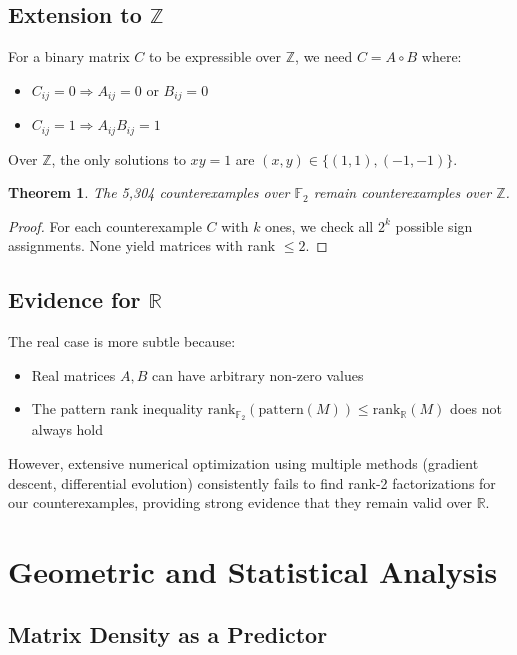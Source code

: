 \documentclass[11pt]{amsart}
\theoremstyle{plain}
\newtheorem{theorem}{Theorem}
\theoremstyle{definition}
\theoremstyle{remark}
\begin{document}
\subsection{Extension to $\mathbb{Z}$}

For a binary matrix $C$ to be expressible over $\mathbb{Z}$, we need $C = A \circ B$ where:
\begin{itemize}
\item $C_{ij} = 0 \Rightarrow A_{ij} = 0$ or $B_{ij} = 0$
\item $C_{ij} = 1 \Rightarrow A_{ij}B_{ij} = 1$
\end{itemize}

Over $\mathbb{Z}$, the only solutions to $xy = 1$ are $(x,y) \in \{(1,1), (-1,-1)\}$.

\begin{theorem}
The 5,304 counterexamples over $\mathbb{F}_2$ remain counterexamples over $\mathbb{Z}$.
\end{theorem}

\begin{proof}
For each counterexample $C$ with $k$ ones, we check all $2^k$ possible sign assignments. None yield matrices with rank $\leq 2$.
\end{proof}

\subsection{Evidence for $\mathbb{R}$}

The real case is more subtle because:
\begin{itemize}
\item Real matrices $A, B$ can have arbitrary non-zero values
\item The pattern rank inequality $\mathrm{rank}_{\mathbb{F}_2}(\mathrm{pattern}(M)) \leq \mathrm{rank}_{\mathbb{R}}(M)$ does not always hold
\end{itemize}

However, extensive numerical optimization using multiple methods (gradient descent, differential evolution) consistently fails to find rank-2 factorizations for our counterexamples, providing strong evidence that they remain valid over $\mathbb{R}$.

\section{Geometric and Statistical Analysis}

\subsection{Matrix Density as a Predictor}
\end{document}
